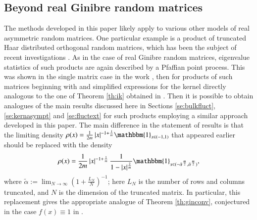 \documentclass[11pt,reqno]{amsproc}
\numberwithin{equation}{section}
\numberwithin{theorem}{section}
\begin{document}
\subsection{Beyond real Ginibre random matrices}
\label{se:beyond}
The methods developed in this paper likely apply to various other models of real asymmetric random matrices. One particular example is a product of truncated Haar distributed orthogonal random matrices, which has been the subject of recent investigations \cite{FK18, FIK20, LMS21}. As in the case of real Ginibre random matrices, eigenvalue statistics of such products are again described by a Pfaffian point process. This was shown in the single matrix case in the work \cite{KSZ10}, then for products of such matrices beginning with \cite{IK14} and simplified expressions for the kernel directly analogous to the one of Theorem \ref{th:ik} obtained in \cite{FIK20}. Then it is possible to obtain analogues of the main results discussed here in Sections \ref{se:bulkfluct}, \ref{se:kernasympt} and \ref{se:fluctext} for such products employing a similar approach developed in this paper. The main difference in the statement of results is that the limiting density $\rho(x) = \frac{1}{2m}\,|x|^{-1+\frac{1}{m}}\mathbbm{1}_{x \in (-1,1)}$ that appeared earlier should be replaced with the density
\begin{equation}
\rho(x) = \frac{1}{2m}\,|x|^{-1+\frac{1}{m}}\,\frac{1}{1-|x|^{\frac{2}{m}}}\mathbbm{1}_{x \in (-\tilde{\alpha}^{\frac{m}{2}}, \tilde{\alpha}^{\frac{m}{2}})}, \label{rhoT}
\end{equation}
where $\tilde{\alpha} := \lim_{N \to \infty}\left(1+\frac{L_{N}}{N}\right)^{-1}$; here  $L_{N}$ is the number of rows and columns truncated, and $N$ is the dimension of the truncated matrix. In particular, this replacement gives the appropriate analogue of Theorem \ref{th:ginconv}, conjectured in the case $f(x) \equiv 1$ in \cite{FIK20}.
\end{document}
